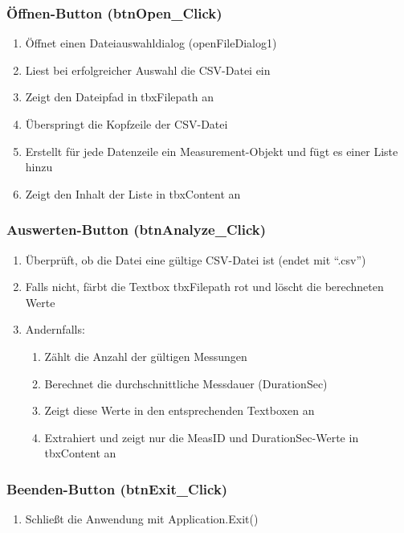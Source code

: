 \documentclass[a4paper,11pt]{article}
\begin{document}
\subsubsection{Öffnen-Button (btnOpen\_Click)}
\begin{enumerate}
    \item Öffnet einen Dateiauswahldialog (openFileDialog1)
    \item Liest bei erfolgreicher Auswahl die CSV-Datei ein
    \item Zeigt den Dateipfad in tbxFilepath an
    \item Überspringt die Kopfzeile der CSV-Datei
    \item Erstellt für jede Datenzeile ein Measurement-Objekt und fügt es einer Liste hinzu
    \item Zeigt den Inhalt der Liste in tbxContent an
\end{enumerate}

\subsubsection{Auswerten-Button (btnAnalyze\_Click)}
\begin{enumerate}
    \item Überprüft, ob die Datei eine gültige CSV-Datei ist (endet mit ``.csv'')
    \item Falls nicht, färbt die Textbox tbxFilepath rot und löscht die berechneten Werte
    \item Andernfalls:
    \begin{enumerate}
        \item Zählt die Anzahl der gültigen Messungen
        \item Berechnet die durchschnittliche Messdauer (DurationSec)
        \item Zeigt diese Werte in den entsprechenden Textboxen an
        \item Extrahiert und zeigt nur die MeasID und DurationSec-Werte in tbxContent an
    \end{enumerate}
\end{enumerate}

\subsubsection{Beenden-Button (btnExit\_Click)}
\begin{enumerate}
    \item Schließt die Anwendung mit Application.Exit()
\end{enumerate}
\end{document}
